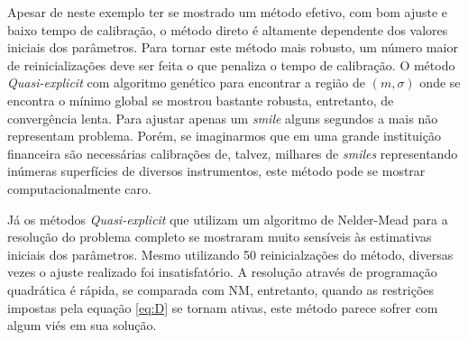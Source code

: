 \documentclass[]{book}
\begin{document}
Apesar de neste exemplo ter se mostrado um método efetivo, com bom
ajuste e baixo tempo de calibração, o método direto é altamente
dependente dos valores iniciais dos parâmetros. Para tornar este método
mais robusto, um número maior de reinicializações deve ser feita o que
penaliza o tempo de calibração. O método \emph{Quasi-explicit} com
algoritmo genético para encontrar a região de \((m, \sigma)\) onde se
encontra o mínimo global se mostrou bastante robusta, entretanto, de
convergência lenta. Para ajustar apenas um \emph{smile} alguns segundos
a mais não representam problema. Porém, se imaginarmos que em uma grande
instituição financeira são necessárias calibrações de, talvez, milhares
de \emph{smiles} representando inúmeras superfícies de diversos
instrumentos, este método pode se mostrar computacionalmente caro.

Já os métodos \emph{Quasi-explicit} que utilizam um algoritmo de
Nelder-Mead para a resolução do problema completo se mostraram muito
sensíveis às estimativas iniciais dos parâmetros. Mesmo utilizando 50
reinicialzações do método, diversas vezes o ajuste realizado foi
insatisfatório. A resolução através de programação quadrática é rápida,
se comparada com NM, entretanto, quando as restrições impostas pela
equação \eqref{eq:D} se tornam ativas, este método parece sofrer com algum
viés em sua solução.


\end{document}
